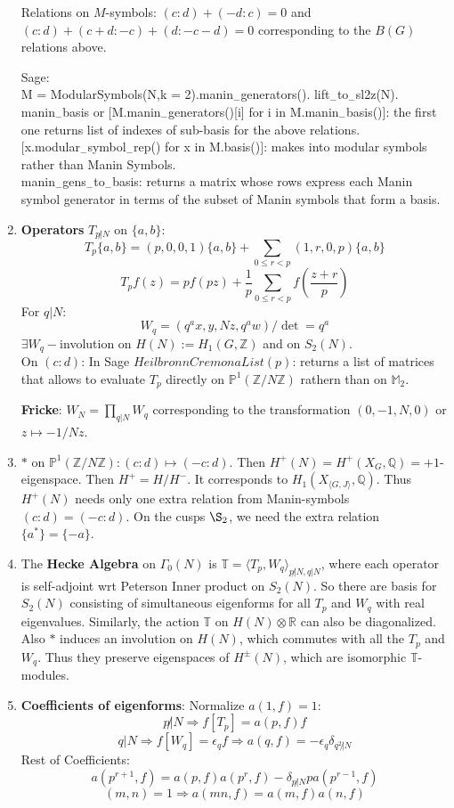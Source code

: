 \documentclass{article}
\newcommand{\Q}{\mathbb{Q}}
\newcommand{\R}{\mathbb{R}}
\newcommand{\Z}{\mathbb{Z}}
\newcommand{\PP}{\mathbb{P}}
\newcommand{\T}{\mathbb{T}}
\newcommand{\M}{\mathbb{M}}
\newcommand{\Ra}{\Rightarrow}
\begin{document}
\begin{multicols}{2}
\begin{enumerate}
Relations on $M$-symbols: $(c:d) + (-d:c) = 0$ and $(c:d) + (c+d:-c) + (d:-c-d) = 0$ corresponding to the $B(G)$ relations above. 


Sage: \\
M = ModularSymbols(N,k = 2).manin$_-$generators(). lift$_-$to$_-$sl2z(N).\\
manin$_-$basis or [M.manin$_-$generators()[i] for i in M.manin$_-$basis()]: the first one returns list of indexes of sub-basis for the above relations.\\
$[$x.modular$_-$symbol$_-$rep() for x in M.basis()$]$: makes into modular symbols rather than Manin Symbols. \\
manin$_-$gens$_-$to$_-$basis: returns a matrix whose rows express each Manin symbol generator in terms of the subset of Manin symbols that form a basis. 

\item \textbf{Operators} $T_{p\not|N}$ on $\{a,b\}$: 
\[T_p\{a,b\} = (p,0,0,1)\{a,b\} + \sum_{0 \leq r < p}(1,r,0,p)\{a,b\}\]
\[T_pf(z) = pf(pz) + \frac{1}{p} \sum_{0 \leq r < p}f\left(\frac{z+r}{p}\right)\]
For $q|N$:
\[W_q = (q^ax,y,Nz,q^aw)/ \det = q^a\]
$\exists W_q-$involution on $H(N):=H_1(G,\Z)$ and on $S_2(N)$.\\
On $(c:d)$: In Sage $HeilbronnCremonaList(p)$: returns a list of matrices that allows to evaluate $T_p$ directly on $\PP^1(\Z/N\Z)$ rathern than on $\M_2$. 

\textbf{Fricke}: $W_N = \prod_{q|N}W_q$ corresponding to the transformation $(0,-1,N,0)$ or $z \mapsto -1/Nz$.\\ 


\item $*$ on $\PP^1(\Z/N\Z): (c:d) \mapsto (-c:d)$. Then $H^+(N) = H^+(X_G,\Q) = +1$-eigenspace. Then $H^+ = H/H^-$. It corresponds to $H_1(X_{\langle G,J \rangle},\Q)$.  Thus $H^+(N)$ needs only one extra relation from Manin-symbols $(c:d) = (-c:d)$. On the cusps $\S_2$, we need the extra relation $\{a^*\} = \{-a\}$.

\item The \textbf{Hecke Algebra} on $\Gamma_0(N)$ is $\mathbb{T} = \langle T_p, W_q\rangle_{p\not|N, q|N}$, where each operator is self-adjoint wrt Peterson Inner product on $S_2(N)$. So there are basis for $S_2(N)$ consisting of simultaneous eigenforms for all $T_p$ and $W_q$ with real eigenvalues. Similarly, the action $\mathbb{T}$ on $H(N) \otimes \R$ can also be diagonalized. \\
Also $*$ induces an involution on $H(N)$, which commutes with all the $T_p$ and $W_q$. Thus they preserve eigenspaces of $H^\pm(N)$, which are isomorphic $\T$-modules. \\

\item \textbf{Coefficients of eigenforms}: Normalize $a(1,f) = 1$: 
\[p\not|N \Ra f[T_p] = a(p,f)f\]
\[q |N \Ra f[W_q] = \epsilon_q f \Ra a(q,f) = -\epsilon_q \delta_{q^2\not|N}\]
Rest of Coefficients:
\[a(p^{r+1},f) = a(p,f)a(p^r,f) - \delta_{p\not|N}pa(p^{r-1},f)\]
\[(m,n) = 1 \Ra a(mn,f) = a(m,f)a(n,f)\]
\end{enumerate}
\end{multicols}
\end{document}
